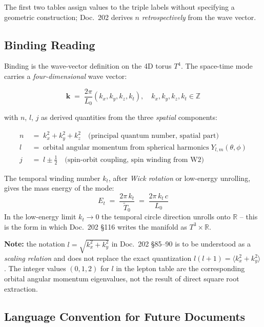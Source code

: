The first two tables assign values to the triple labels without
specifying a geometric construction; Doc.~202 derives $n$
\emph{retrospectively} from the wave vector.

\subsection*{Binding Reading}

Binding is the wave-vector definition on the 4D torus $T^4$. The
space-time mode carries a \emph{four-dimensional} wave vector:

\begin{equation}
  \boxed{\;\mathbf{k} \;=\; \frac{2\pi}{L_0}(k_x,k_y,k_z,k_t),
  \quad k_x,k_y,k_z,k_t \in \mathbb{Z}\;}
  \tag{210.4}
\end{equation}

with $n$, $l$, $j$ as derived quantities from the three
\emph{spatial} components:

\begin{align}
  n &\;=\; k_x^2 + k_y^2 + k_z^2
       \quad\text{(principal quantum number, spatial part)} \tag{210.5}\\
  l &\;=\; \text{orbital angular momentum from spherical harmonics}
       \;Y_{l,m}(\theta,\phi) \tag{210.6}\\
  j &\;=\; l \pm \tfrac12
       \quad\text{(spin-orbit coupling, spin winding from W2)} \tag{210.7}
\end{align}

The temporal winding number $k_t$, after \emph{Wick rotation} or
low-energy unrolling, gives the mass energy of the mode:
\begin{equation}
  E_t \;=\; \frac{2\pi\, k_t}{\tilde T_0} \;=\; \frac{2\pi\,k_t\,c}{L_0}
  \tag{210.7a}
\end{equation}
In the low-energy limit $k_t \to 0$ the temporal circle direction
unrolls onto $\mathbb{R}$ -- this is the form in which Doc.~202 §116
writes the manifold as $T^3 \times \mathbb{R}$.

\textbf{Note:} the notation $l = \sqrt{k_x^2+k_y^2}$ in Doc.~202 §85--90
is to be understood as a \emph{scaling relation} and does not replace
the exact quantization $l(l+1) = \langle k_x^2+k_y^2 \rangle$. The
integer values $(0,1,2)$ for $l$ in the lepton table are the
corresponding orbital angular momentum eigenvalues, not the result of
direct square root extraction.

\subsection*{Language Convention for Future Documents}

